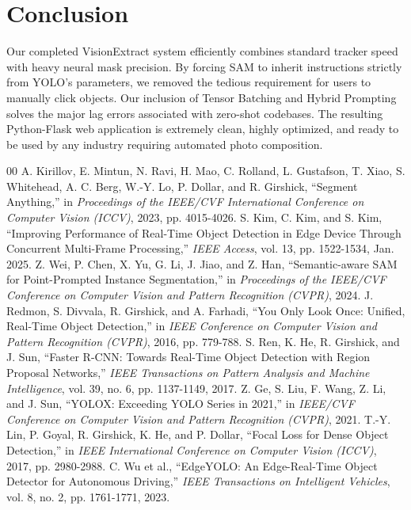 \documentclass[10pt, conference]{IEEEtran}
\begin{document}
\section{Conclusion}
Our completed VisionExtract system efficiently combines standard tracker speed with heavy neural mask precision. By forcing SAM to inherit instructions strictly from YOLO's parameters, we removed the tedious requirement for users to manually click objects. Our inclusion of Tensor Batching and Hybrid Prompting solves the major lag errors associated with zero-shot codebases. The resulting Python-Flask web application is extremely clean, highly optimized, and ready to be used by any industry requiring automated photo composition.

\begin{thebibliography}{00}
 A. Kirillov, E. Mintun, N. Ravi, H. Mao, C. Rolland, L. Gustafson, T. Xiao, S. Whitehead, A. C. Berg, W.-Y. Lo, P. Dollar, and R. Girshick, ``Segment Anything,'' in \textit{Proceedings of the IEEE/CVF International Conference on Computer Vision (ICCV)}, 2023, pp. 4015-4026.
 S. Kim, C. Kim, and S. Kim, ``Improving Performance of Real-Time Object Detection in Edge Device Through Concurrent Multi-Frame Processing,'' \textit{IEEE Access}, vol. 13, pp. 1522-1534, Jan. 2025.
 Z. Wei, P. Chen, X. Yu, G. Li, J. Jiao, and Z. Han, ``Semantic-aware SAM for Point-Prompted Instance Segmentation,'' in \textit{Proceedings of the IEEE/CVF Conference on Computer Vision and Pattern Recognition (CVPR)}, 2024.
 J. Redmon, S. Divvala, R. Girshick, and A. Farhadi, ``You Only Look Once: Unified, Real-Time Object Detection,'' in \textit{IEEE Conference on Computer Vision and Pattern Recognition (CVPR)}, 2016, pp. 779-788.
 S. Ren, K. He, R. Girshick, and J. Sun, ``Faster R-CNN: Towards Real-Time Object Detection with Region Proposal Networks,'' \textit{IEEE Transactions on Pattern Analysis and Machine Intelligence}, vol. 39, no. 6, pp. 1137-1149, 2017.
 Z. Ge, S. Liu, F. Wang, Z. Li, and J. Sun, ``YOLOX: Exceeding YOLO Series in 2021,'' in \textit{IEEE/CVF Conference on Computer Vision and Pattern Recognition (CVPR)}, 2021.
 T.-Y. Lin, P. Goyal, R. Girshick, K. He, and P. Dollar, ``Focal Loss for Dense Object Detection,'' in \textit{IEEE International Conference on Computer Vision (ICCV)}, 2017, pp. 2980-2988.
 C. Wu et al., ``EdgeYOLO: An Edge-Real-Time Object Detector for Autonomous Driving,'' \textit{IEEE Transactions on Intelligent Vehicles}, vol. 8, no. 2, pp. 1761-1771, 2023.

\end{thebibliography}
\end{document}

